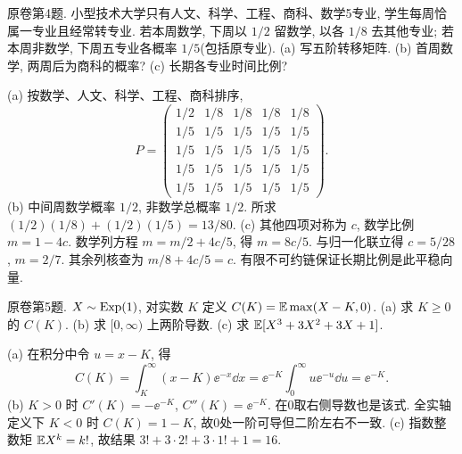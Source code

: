 \begin{exercise}\label{ex:flf19-4}
原卷第4题. 小型技术大学只有人文、科学、工程、商科、数学5专业, 学生每周恰属一专业且经常转专业. 若本周数学, 下周以 $1/2$ 留数学, 以各 $1/8$ 去其他专业; 若本周非数学, 下周五专业各概率 $1/5$(包括原专业). (a) 写五阶转移矩阵. (b) 首周数学, 两周后为商科的概率? (c) 长期各专业时间比例?
\end{exercise}
\begin{solution}
(a)\label{sol:flf19-4-a} 按数学、人文、科学、工程、商科排序,
\[P=\begin{pmatrix}1/2&1/8&1/8&1/8&1/8\\1/5&1/5&1/5&1/5&1/5\\1/5&1/5&1/5&1/5&1/5\\1/5&1/5&1/5&1/5&1/5\\1/5&1/5&1/5&1/5&1/5\end{pmatrix}.\]
(b)\label{sol:flf19-4-b} 中间周数学概率 $1/2$, 非数学总概率 $1/2$. 所求 $(1/2)(1/8)+(1/2)(1/5)=13/80$.
(c)\label{sol:flf19-4-c} 其他四项对称为 $c$, 数学比例 $m=1-4c$. 数学列方程 $m=m/2+4c/5$, 得 $m=8c/5$. 与归一化联立得 $c=5/28$, $m=2/7$. 其余列核查为 $m/8+4c/5=c$. 有限不可约链保证长期比例是此平稳向量.
\end{solution}

\begin{exercise}\label{ex:flf19-5}
原卷第5题. $X\sim\operatorname{Exp}(1)$, 对实数 $K$ 定义 $C(K)=\mathbb E\max(X-K,0)$. (a) 求 $K\geq0$ 的 $C(K)$. (b) 求 $[0,\infty)$ 上两阶导数. (c) 求 $\mathbb E[X^3+3X^2+3X+1]$.
\end{exercise}
\begin{solution}
(a)\label{sol:flf19-5-a} 在积分中令 $u=x-K$, 得
\[C(K)=\int_K^\infty(x-K)\ee^{-x}\dd x
=\ee^{-K}\int_0^\infty u\ee^{-u}\dd u=\ee^{-K}.\]
(b)\label{sol:flf19-5-b} $K>0$ 时 $C'(K)=-\ee^{-K}$, $C''(K)=\ee^{-K}$. 在0取右侧导数也是该式. 全实轴定义下 $K<0$ 时 $C(K)=1-K$, 故0处一阶可导但二阶左右不一致.
(c)\label{sol:flf19-5-c} 指数整数矩 $\mathbb E X^k=k!$, 故结果 $3!+3\cdot2!+3\cdot1!+1=16$.
\end{solution}

